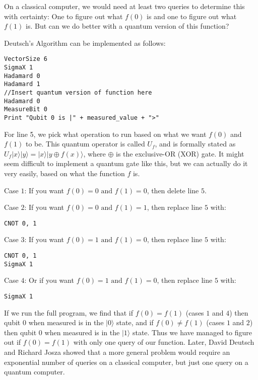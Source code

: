\documentclass[twocolumn]{article}
\begin{document}
On a classical computer, we would need at least two queries to determine this with certainty: One to figure out what $f(0)$ is and one to figure out what $f(1)$ is. But can we do better with a quantum version of this function?

Deutsch's Algorithm can be implemented as follows:

\begin{lstlisting}
VectorSize 6
SigmaX 1
Hadamard 0
Hadamard 1
//Insert quantum version of function here
Hadamard 0
MeasureBit 0
Print "Qubit 0 is |" + measured_value + ">"
\end{lstlisting}

For line 5, we pick what operation to run based on what we want $f(0)$ and $f(1)$ to be. This quantum operator is called $U_f$, and is formally stated as $U_f|x\rangle|y\rangle = |x\rangle|y \oplus f(x)\rangle$, where $\oplus$ is the exclusive-OR (XOR) gate. It might seem difficult to implement a quantum gate like this, but we can actually do it very easily, based on what the function $f$ is.

Case $1$: If you want $f(0) = 0 \text{ and } f(1) = 0$, then delete line $5$.

Case $2$: If you want $f(0) = 0 \text{ and } f(1) = 1$, then replace line $5$ with:

\begin{lstlisting}
CNOT 0, 1
\end{lstlisting}

Case $3$: If you want $f(0) = 1 \text{ and } f(1) = 0$, then replace line $5$ with:

\begin{lstlisting}
CNOT 0, 1
SigmaX 1
\end{lstlisting}

Case $4$: Or if you want $f(0) = 1 \text{ and } f(1) = 0$, then replace line $5$ with:

\begin{lstlisting}
SigmaX 1
\end{lstlisting}

If we run the full program, we find that if $f(0) = f(1)$ (cases $1$ and $4$) then qubit $0$ when measured is in the $|0\rangle$ state, and if $f(0) \neq f(1)$ (cases $1$ and $2$) then qubit $0$ when measured is in the $|1\rangle$ state. Thus we have managed to figure out if $f(0) = f(1)$ with only one query of our function. Later, David Deutsch and Richard Josza showed that a more general problem would require an exponential number of queries on a classical computer, but just one query on a quantum computer.
\end{document}
